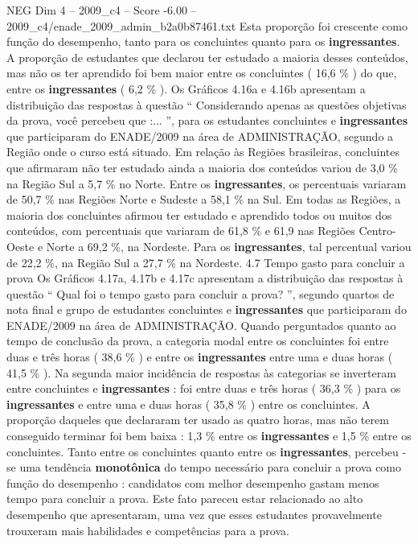\begin{textsample}{NEG Dim 4 – 2009\_c4 – Score -6.00 – 2009\_c4/enade\_2009\_admin\_b2a0b87461.txt}
Esta proporção foi crescente como função do desempenho, tanto para os concluintes quanto para os \textbf{ingressantes}.
A proporção de estudantes que declarou ter estudado a maioria desses conteúdos, mas não os ter aprendido foi bem maior entre os concluintes ( 16,6 \% ) do que, entre os \textbf{ingressantes} ( 6,2 \% ).
Os Gráficos 4.16a e 4.16b apresentam a distribuição das respostas à questão “ Considerando apenas as questões objetivas da prova, você percebeu que :... ”, para os estudantes concluintes e \textbf{ingressantes} que participaram do ENADE/2009 na área de ADMINISTRAÇÃO, segundo a Região onde o curso está situado.
Em relação às Regiões brasileiras, concluintes que afirmaram não ter estudado ainda a maioria dos conteúdos variou de 3,0 \% na Região Sul a 5,7 \% no Norte.
Entre os \textbf{ingressantes}, os percentuais variaram de 50,7 \% nas Regiões Norte e Sudeste a 58,1 \% na Sul.
Em todas as Regiões, a maioria dos concluintes afirmou ter estudado e aprendido todos ou muitos dos conteúdos, com percentuais que variaram de 61,8 \% e 61,9 nas Regiões Centro-Oeste e Norte a 69,2 \%, na Nordeste.
Para os \textbf{ingressantes}, tal percentual variou de 22,2 \%, na Região Sul a 27,7 \% na Nordeste. 4.7 Tempo gasto para concluir a prova Os Gráficos 4.17a, 4.17b e 4.17c apresentam a distribuição das respostas à questão “ Qual foi o tempo gasto para concluir a prova? ”, segundo quartos de nota final e grupo de estudantes concluintes e \textbf{ingressantes} que participaram do ENADE/2009 na área de ADMINISTRAÇÃO.
Quando perguntados quanto ao tempo de conclusão da prova, a categoria modal entre os concluintes foi entre duas e três horas ( 38,6 \% ) e entre os \textbf{ingressantes} entre uma e duas horas ( 41,5 \% ).
Na segunda maior incidência de respostas às categorias se inverteram entre concluintes e \textbf{ingressantes} : foi entre duas e três horas ( 36,3 \% ) para os \textbf{ingressantes} e entre uma e duas horas ( 35,8 \% ) entre os concluintes.
A proporção daqueles que declararam ter usado as quatro horas, mas não terem conseguido terminar foi bem baixa : 1,3 \% entre os \textbf{ingressantes} e 1,5 \% entre os concluintes.
Tanto entre os concluintes quanto entre os \textbf{ingressantes}, percebeu -se uma tendência \textbf{monotônica} do tempo necessário para concluir a prova como função do desempenho : candidatos com melhor desempenho gastam menos tempo para concluir a prova.
Este fato pareceu estar relacionado ao alto desempenho que apresentaram, uma vez que esses estudantes provavelmente trouxeram mais habilidades e competências para a prova.

\end{textsample}
